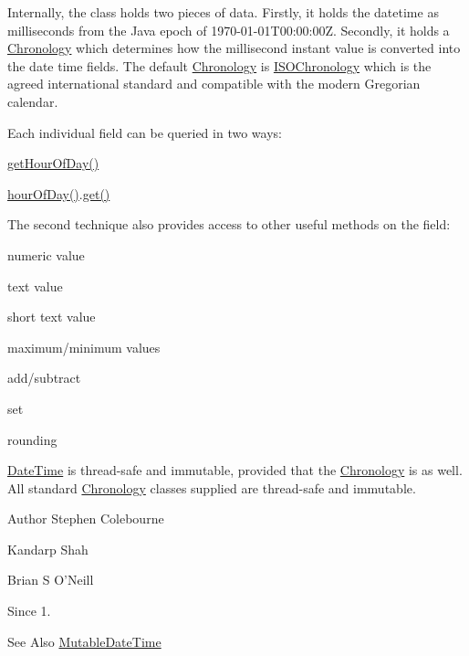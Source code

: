 Internally, the class holds two pieces of data. Firstly, it holds the datetime as milliseconds from the Java epoch of 1970-\/01-\/01\-T00\-:00\-:00\-Z. Secondly, it holds a \hyperlink{classorg_1_1joda_1_1time_1_1_chronology}{Chronology} which determines how the millisecond instant value is converted into the date time fields. The default \hyperlink{classorg_1_1joda_1_1time_1_1_chronology}{Chronology} is \hyperlink{}{I\-S\-O\-Chronology} which is the agreed international standard and compatible with the modern Gregorian calendar. 

Each individual field can be queried in two ways\-: 
\begin{DoxyItemize}
\item {\ttfamily \hyperlink{interfaceorg_1_1joda_1_1time_1_1_readable_date_time_a934d3c7576e35384e1e80610d275e937}{get\-Hour\-Of\-Day()}} 
\item {\ttfamily \hyperlink{classorg_1_1joda_1_1time_1_1_date_time_ad4d63b2e220315cf5eb57d3960f65ba5}{hour\-Of\-Day()}.\hyperlink{classorg_1_1joda_1_1time_1_1base_1_1_abstract_date_time_af30504cd429178fe15ecf1df8684cc85}{get()}} 
\end{DoxyItemize}The second technique also provides access to other useful methods on the field\-: 
\begin{DoxyItemize}
\item numeric value 
\item text value 
\item short text value 
\item maximum/minimum values 
\item add/subtract 
\item set 
\item rounding 
\end{DoxyItemize}

\hyperlink{classorg_1_1joda_1_1time_1_1_date_time}{Date\-Time} is thread-\/safe and immutable, provided that the \hyperlink{classorg_1_1joda_1_1time_1_1_chronology}{Chronology} is as well. All standard \hyperlink{classorg_1_1joda_1_1time_1_1_chronology}{Chronology} classes supplied are thread-\/safe and immutable.

\begin{DoxyAuthor}{Author}
Stephen Colebourne 

Kandarp Shah 

Brian S O'Neill 
\end{DoxyAuthor}
\begin{DoxySince}{Since}
1. 
\end{DoxySince}
\begin{DoxySeeAlso}{See Also}
\hyperlink{classorg_1_1joda_1_1time_1_1_mutable_date_time}{Mutable\-Date\-Time} 
\end{DoxySeeAlso}


